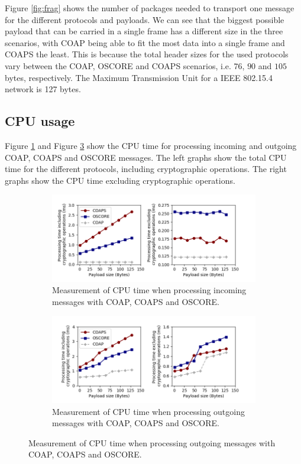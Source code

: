 {Figure \ref{fig:frag} shows the number of packages needed to transport one message for the different protocols and payloads. We can see that the biggest possible payload that can be carried in a single frame has a different size in the three scenarios, with COAP being able to fit the most data into a single frame and COAPS the least. This is because the total header sizes for the used protocols vary between the COAP, OSCORE and COAPS scenarios, i.e. $76$, $90$ and $105$ bytes, respectively. The Maximum Transmission Unit for a IEEE 802.15.4 network is 127 bytes.

\subsection{CPU usage}
Figure \ref{fig:parse} and Figure \ref{fig:serialize} show the CPU time for processing incoming and outgoing COAP, COAPS and OSCORE messages. The left graphs show the total CPU time for the different protocols, including cryptographic operations. The right graphs show the CPU time excluding cryptographic operations.
\begin{figure}[h]
\begin{subfigure}{1.0\textwidth}
\centering
\includegraphics[width=1.0\textwidth]{papers/oscore/images/proc.png}
\caption[Processing measurements]{Measurement of CPU time when processing incoming messages with COAP, COAPS and OSCORE. }
\label{fig:parse}
\end{subfigure}

\begin{subfigure}[h]{1.0\textwidth}
\centering
\includegraphics[width=1.0\textwidth]{papers/oscore/images/serialize.png}
\caption[Processing measurements]{Measurement of CPU time when processing outgoing messages with COAP, COAPS and OSCORE. }
\label{fig:serialize}
\end{subfigure}
\end{figure}

}
